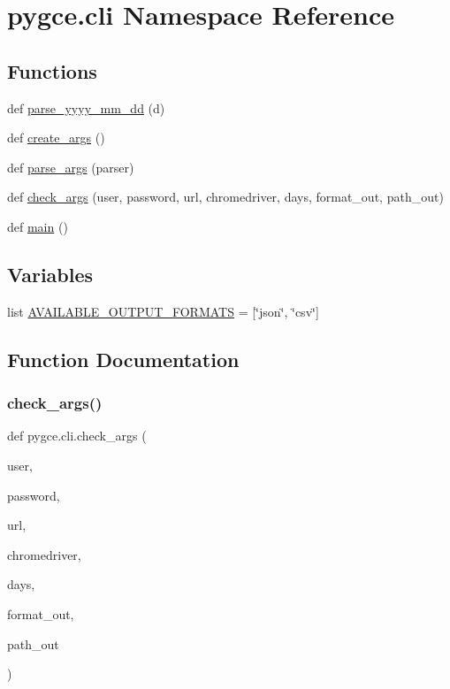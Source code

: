 \hypertarget{namespacepygce_1_1cli}{}\section{pygce.\+cli Namespace Reference}
\label{namespacepygce_1_1cli}
\subsection*{Functions}
\begin{DoxyCompactItemize}
\item 
def \hyperlink{namespacepygce_1_1cli_a807a6becfdbbb6dab4fede7208861afc}{parse\+\_\+yyyy\+\_\+mm\+\_\+dd} (d)
\item 
def \hyperlink{namespacepygce_1_1cli_a5734100556cffce34b4b53f9d027080b}{create\+\_\+args} ()
\item 
def \hyperlink{namespacepygce_1_1cli_a7729e758c25a70a57c0578bd4dde32df}{parse\+\_\+args} (parser)
\item 
def \hyperlink{namespacepygce_1_1cli_a15e4213eee5373558d6f7b59b6a84498}{check\+\_\+args} (user, password, url, chromedriver, days, format\+\_\+out, path\+\_\+out)
\item 
def \hyperlink{namespacepygce_1_1cli_a696dc9e135d9815a0d4a889eb94c18fb}{main} ()
\end{DoxyCompactItemize}
\subsection*{Variables}
\begin{DoxyCompactItemize}
\item 
list \hyperlink{namespacepygce_1_1cli_a13e8047ab788ce64d94c1077ad4218e5}{A\+V\+A\+I\+L\+A\+B\+L\+E\+\_\+\+O\+U\+T\+P\+U\+T\+\_\+\+F\+O\+R\+M\+A\+TS} = \mbox{[}\char`\"{}json\char`\"{}, \char`\"{}csv\char`\"{}\mbox{]}
\end{DoxyCompactItemize}


\subsection{Function Documentation}
\mbox{\label{namespacepygce_1_1cli_a15e4213eee5373558d6f7b59b6a84498}} 
\subsubsection{\texorpdfstring{check\+\_\+args()}{check\_args()}}
{\footnotesize\ttfamily def pygce.\+cli.\+check\+\_\+args (\begin{DoxyParamCaption}\item[{}]{user,  }\item[{}]{password,  }\item[{}]{url,  }\item[{}]{chromedriver,  }\item[{}]{days,  }\item[{}]{format\+\_\+out,  }\item[{}]{path\+\_\+out }\end{DoxyParamCaption})}

